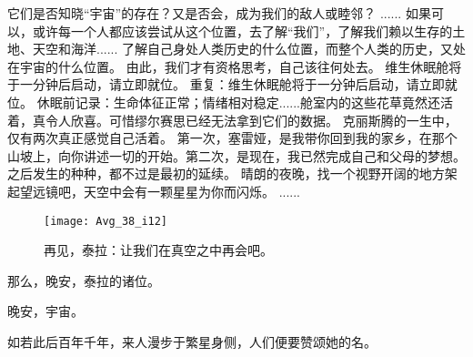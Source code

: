 \documentclass[openany]{book}
\begin{document}
\begin{dialogue}
     它们是否知晓“宇宙”的存在？又是否会，成为我们的敌人或睦邻？
     ......
     如果可以，或许每一个人都应该尝试从这个位置，去了解“我们”，了解我们赖以生存的土地、天空和海洋......
     了解自己身处人类历史的什么位置，而整个人类的历史，又处在宇宙的什么位置。
     由此，我们才有资格思考，自己该往何处去。
     维生休眠舱将于一分钟后启动，请立即就位。
     重复：维生休眠舱将于一分钟后启动，请立即就位。
     休眠前记录：生命体征正常；情绪相对稳定......舱室内的这些花草竟然还活着，真令人欣喜。可惜缪尔赛思已经无法拿到它们的数据。
     克丽斯腾的一生中，仅有两次真正感觉自己活着。
     第一次，塞雷娅，是我带你回到我的家乡，在那个山坡上，向你讲述一切的开始。第二次，是现在，我已然完成自己和父母的梦想。
     之后发生的种种，都不过是最初的延续。
     晴朗的夜晚，找一个视野开阔的地方架起望远镜吧，天空中会有一颗星星为你而闪烁。
     ......
\end{dialogue}\clearpage

\begin{figure}[h]
    \caption*{再见，泰拉：让我们在真空之中再会吧。}
    \centering
    \texttt{[image: Avg\_38\_i12]}
\end{figure}
那么，晚安，泰拉的诸位。\par
晚安，宇宙。\par
如若此后百年千年，来人漫步于繁星身侧，人们便要赞颂她的名。
\clearpage
\end{document}
